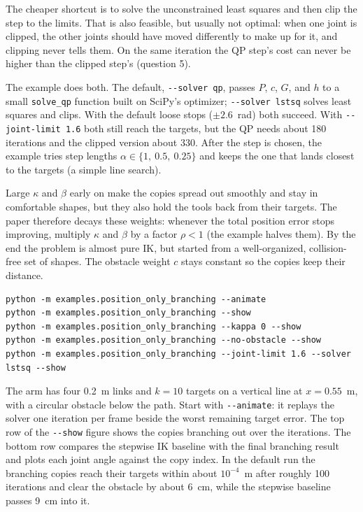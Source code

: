 The cheaper shortcut is to solve the unconstrained least squares and then
clip the step to the limits. That is also feasible, but usually not optimal:
when one joint is clipped, the other joints should have moved differently to
make up for it, and clipping never tells them. On the same iteration the QP
step's cost can never be higher than the clipped step's (question 5).

The example does both. The default, \texttt{-{}-solver qp}, passes $P$, $c$,
$G$, and $h$ to a small \texttt{solve\_qp} function built on SciPy's
optimizer; \texttt{-{}-solver lstsq} solves least squares and clips. With the
default loose stops ($\pm2.6$~rad) both succeed. With
\texttt{-{}-joint-limit 1.6} both still reach the targets, but the QP needs
about 180 iterations and the clipped version about 330. After the step is
chosen, the example tries step lengths $\alpha\in\{1,\ 0.5,\ 0.25\}$ and keeps
the one that lands closest to the targets (a simple line search).

Large $\kappa$ and $\beta$ early on make the copies spread out smoothly and
stay in comfortable shapes, but they also hold the tools back from their
targets. The paper therefore decays these weights: whenever the total
position error stops improving, multiply $\kappa$ and $\beta$ by a factor
$\rho<1$ (the example halves them). By the end the problem is almost pure
IK, but started from a well-organized, collision-free set of shapes. The
obstacle weight $c$ stays constant so the copies keep their distance.

\begin{lstlisting}
python -m examples.position_only_branching --animate
python -m examples.position_only_branching --show
python -m examples.position_only_branching --kappa 0 --show
python -m examples.position_only_branching --no-obstacle --show
python -m examples.position_only_branching --joint-limit 1.6 --solver lstsq --show
\end{lstlisting}
The arm has four 0.2~m links and $k=10$ targets on a vertical line at
$x=0.55$~m, with a circular obstacle below the path. Start with
\texttt{-{}-animate}: it replays the solver one iteration per frame beside the
worst remaining target error. The top row of the \texttt{-{}-show} figure
shows the copies branching out over the iterations. The bottom row
compares the stepwise IK baseline with the final branching result and plots
each joint angle against the copy index. In the default run the branching
copies reach their targets within about $10^{-4}$~m after roughly 100
iterations and clear the obstacle by about 6~cm, while the stepwise baseline
passes 9~cm into it.

